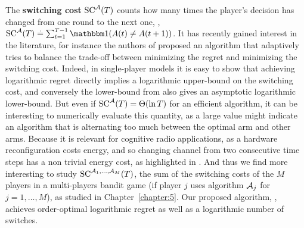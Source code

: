 
The \textbf{switching cost} $\mathrm{SC}^{\mathcal{A}}(T)$ counts how many times the player's decision has changed from one round to the next one, \ie, $\mathrm{SC}^{\cA}(T) \eqdef \sum_{t=1}^{T-1} \indic(A(t) \neq A(t+1))$.
It has recently gained interest in the literature, for instance the authors of \cite{Koren17} proposed an algorithm that adaptively tries to balance the trade-off between minimizing the regret and minimizing the switching cost.
%
Indeed, in single-player models it is easy to show that achieving logarithmic regret directly implies a logarithmic upper-bound on the switching cost, and conversely the lower-bound from \cite{LaiRobbins85} also gives an asymptotic logarithmic lower-bound.
But even if $\mathrm{SC}^{\mathcal{A}}(T) = \Theta(\ln T)$ for an efficient algorithm, it can be interesting to numerically evaluate this quantity, as a large value might indicate an algorithm that is alternating too much between the optimal arm and other arms.
%
Because it is relevant for cognitive radio applications, as a hardware reconfiguration costs energy, and so changing channel from two consecutive time steps has a non trivial energy cost, as highlighted in \cite{modiDemo2016}.
And thus we find more interesting to study $\mathrm{SC}^{\mathcal{A}_1,\dots,\mathcal{A}_M}(T)$, the sum of the switching costs of the $M$ players in a multi-players bandit game (if player $j$ uses algorithm $\mathcal{A}_j$ for $j=1,\dots,M$), as studied in Chapter~\ref{chapter:5}.
Our proposed algorithm, \MCTopM, achieves order-optimal logarithmic regret as well as a logarithmic number of switches.
